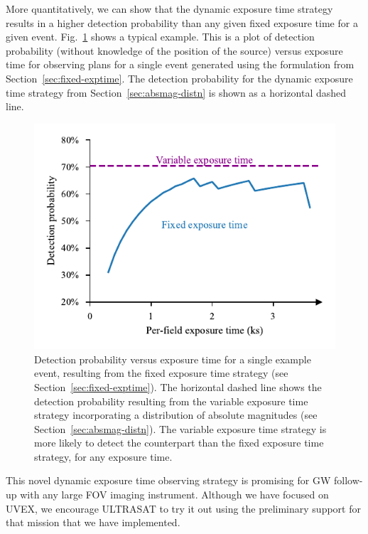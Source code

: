 \documentclass[twocolumn,times]{aastex631}
\begin{document}
More quantitatively, we can show that the dynamic exposure time strategy results in a higher detection probability than any given fixed exposure time for a given event. Fig.~\ref{fig:prob-exptime} shows a typical example. This is a plot of detection probability (without knowledge of the position of the source) versus exposure time for observing plans for a single event generated using the formulation from Section~\ref{sec:fixed-exptime}. The detection probability for the dynamic exposure time strategy from Section~\ref{sec:absmag-distn} is shown as a horizontal dashed line.

\begin{figure}
    \includegraphics[width=\columnwidth]{figures/prob-exptime}
    \caption{\label{fig:prob-exptime}Detection probability versus exposure time for a single example event, resulting from the fixed exposure time strategy (see Section~\ref{sec:fixed-exptime}). The horizontal dashed line shows the detection probability resulting from the variable exposure time strategy incorporating a distribution of absolute magnitudes (see Section~\ref{sec:absmag-distn}). The variable exposure time strategy is more likely to detect the counterpart than the fixed exposure time strategy, for any exposure time.}
\end{figure}

This novel dynamic exposure time observing strategy is promising for \ac{GW} follow-up with any large \ac{FOV} imaging instrument. Although we have focused on \ac{UVEX}, we encourage ULTRASAT to try it out using the preliminary support for that mission that we have implemented.
\end{document}
